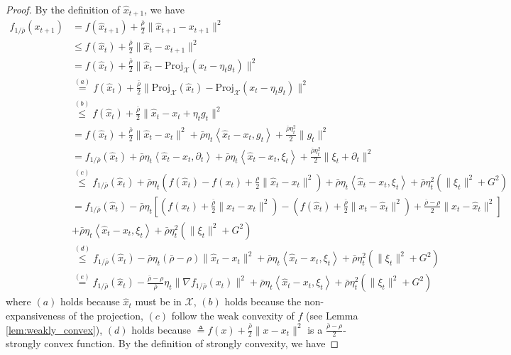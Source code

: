 \documentclass{article}
\def \X {\mathcal{X}}
\def \brho {\bar{\rho}}
\def \hx {\hat{x}}
\begin{document}
\begin{proof}
    By the definition of $\hx_{t+1}$, we have
    \begin{align}
        f_{1/\bar{\rho}}(x_{t+1})&=f(\hx_{t+1})+\frac{\brho}{2}\|\hx_{t+1}-x_{t+1}\|^2\nonumber\\
        &\leq f(\hx_t) + \frac{\brho}{2}\|\hx_t-x_{t+1}\|^2\nonumber\\
        &= f(\hx_t) + \frac{\brho}{2}\|\hx_t-\mathrm{Proj}_\X(x_t-\eta_tg_t)\|^2\nonumber\\
        &\overset{(a)}{=}f(\hx_t) + \frac{\brho}{2}\|\mathrm{Proj}_\X(\hx_t)-\mathrm{Proj}_\X(x_t-\eta_tg_t)\|^2\nonumber\\
        &\overset{(b)}{\leq} f(\hx_t) + \frac{\brho}{2}\|\hx_t-x_t+\eta_tg_t\|^2\nonumber\\
        &= f(\hx_t) + \frac{\brho}{2}\|\hx_t-x_t\|^2 + \brho\eta_t\left\langle \hx_t-x_t, g_t \right\rangle + \frac{\brho\eta_t^2}{2}\|g_t\|^2\nonumber\\
        &= f_{1/\brho}(\hx_t) + \brho\eta_t\left\langle \hx_t-x_t, \partial_t \right\rangle + \brho\eta_t\left\langle \hx_t-x_t, \xi_t \right\rangle + \frac{\brho\eta_t^2}{2}\|\xi_t+\partial_t\|^2\nonumber\\
        &\overset{(c)}{\leq} f_{1/\brho}(\hx_t) + \brho\eta_t\left(f(\hx_t)-f(x_t) + \frac{\rho}{2}\|\hx_t-x_t\|^2\right) + \brho\eta_t\left\langle \hx_t-x_t, \xi_t \right\rangle+ \brho\eta_t^2(\|\xi_t\|^2 + G^2)\nonumber\\
        &=f_{1/\brho}(\hx_t) -\brho\eta_t\left[\left(f(x_t)+\frac{\brho}{2}\|x_t-x_t\|^2\right)-\left(f(\hx_t)+\frac{\brho}{2}\|x_t-\hx_t\|^2\right)+\frac{\brho-\rho}{2}\|x_t-\hx_t\|^2\right]\nonumber\\
        &+ \brho\eta_t\left\langle \hx_t-x_t, \xi_t \right\rangle+ \brho\eta_t^2(\|\xi_t\|^2 + G^2)\nonumber\\
        &\overset{(d)}{\leq} f_{1/\brho}(\hx_t) -\brho\eta_t(\brho-\rho)\|\hx_t-x_t\|^2 + \brho\eta_t\left\langle \hx_t-x_t, \xi_t \right\rangle+ \brho\eta_t^2(\|\xi_t\|^2 + G^2)\nonumber\\
        &\overset{(e)}{=} f_{1/\brho}(\hx_t) - \frac{\brho-\rho}{\brho}\eta_t\|\nabla f_{1/\brho}(x_t)\|^2 + \brho\eta_t\left\langle \hx_t-x_t, \xi_t \right\rangle+ \brho\eta_t^2(\|\xi_t\|^2 + G^2)
    \end{align}
    where $(a)$ holds because $\hx_t$ must be in $\X$, $(b)$ holds because the non-expansiveness of the projection, $(c)$ follow the weak convexity of $f$ (see Lemma \ref{lem:weakly_convex}), $(d)$ holds because $\triangleq f(x) + \frac{\brho}{2}\|x-x_t\|^2$ is a $\frac{\brho-\rho}{2}$-strongly convex function. By the definition of strongly convexity, we have

\end{proof}
\end{document}
